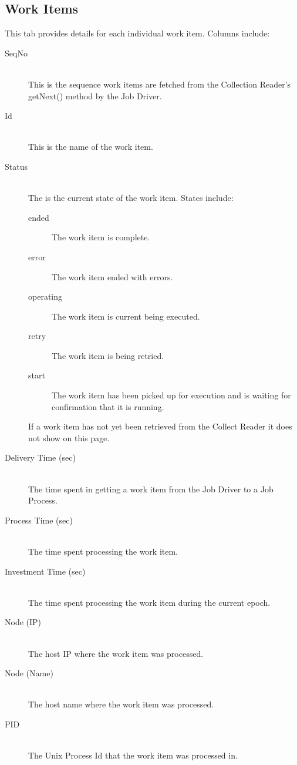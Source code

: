    \subsection{Work Items}
   \label{subsec:ws-work-items}
   This tab provides details for each individual work item.  Columns include:

   \begin{description}
     \item[SeqNo]  \hfill \\
       This is the sequence work items are fetched from the Collection Reader's
       getNext() method by the {\DUCC} Job Driver.
     \item[Id]  \hfill \\
       This is the name of the work item.
     \item[Status]  \hfill \\
       The is the current state of the work item.  
       States include:
       \begin{description}
         \item[ended] The work item is complete.
         \item[error] The work item ended with errors.
         \item[operating] The work item is current being executed.
         \item[retry] The work item is being retried.
         \item[start] The work item has been picked up for execution and {\DUCC} is waiting
           for confirmation that it is running.
       \end{description}
       If a work item has not yet been retrieved from the Collect Reader it does not show
       on this page.
     \item[Delivery Time (sec)]  \hfill \\
       The time spent in getting a work item from the Job Driver to a Job Process.
     \item[Process Time (sec)]  \hfill \\
       The time spent processing the work item.
     \item[Investment Time (sec)]  \hfill \\
       The time spent processing the work item during the current epoch.
     \item[Node (IP)]  \hfill \\
       The host IP where the work item was processed.
     \item[Node (Name)]  \hfill \\
       The host name where the work item was processed.
     \item[PID]  \hfill \\
       The Unix Process Id that the work item was processed in.
   \end{description}
    
